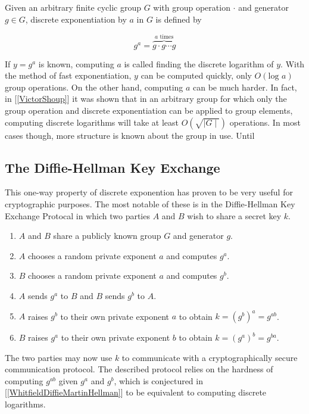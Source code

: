 
Given an arbitrary finite cyclic group $G$ with group operation $\cdot$ and generator $g \in G$, discrete exponentiation by $a$ in $G$ is defined by 

$$
g^a = \overbrace{g \cdot g \cdots g}^{a \text{ times}}
$$

If $y = g^a$ is known, computing $a$ is called finding the discrete logarithm of $y$. With the method of fast exponentiation, $y$ can be computed quickly, only $O(\text{log } a)$ group operations. On the other hand, computing $a$ can be much harder. In fact, in [\ref{VictorShoup}] it was shown that in an arbitrary group for which only the group operation and discrete exponentiation can be applied to group elements, computing discrete logarithms will take at least $O(\sqrt{\mid G \mid})$ operations. In most cases though, more structure is known about the group in use. Until 

\subsection{The Diffie-Hellman Key Exchange}

This one-way property of discrete exponention has proven to be very useful for cryptographic purposes. The most notable of these is in the Diffie-Hellman Key Exchange Protocal in which two parties $A$ and $B$ wish to share a secret key $k$. 

\begin{enumerate}[1.]
	\item $A$ and $B$ share a publicly known group $G$ and generator $g$. 
	\item $A$ chooses a random private exponent $a$ and computes $g^a$.
	\item $B$ chooses a random private exponent $a$ and computes $g^b$.
	\item $A$ sends $g^a$ to $B$ and $B$ sends $g^b$ to $A$. 
	\item $A$ raises $g^b$ to their own private exponent $a$ to obtain $k = (g^b)^a = g^{ab}$.
	\item $B$ raises $g^a$ to their own private exponent $b$ to obtain $k = (g^a)^b = g^{ba}$.
\end{enumerate}

The two parties may now use $k$ to communicate with a cryptographically secure communication protocol. The described protocol relies on the hardness of computing $g^{ab}$ given $g^a$ and $g^b$, which is conjectured in [\ref{WhitfieldDiffieMartinHellman}] to be equivalent to computing discrete logarithms.


